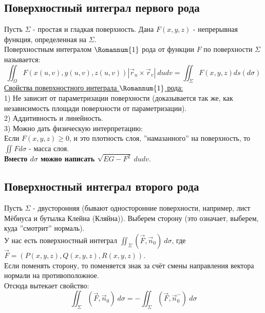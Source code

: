 \documentclass[12pt]{article}
\begin{document}
\subsection{Поверхностный интеграл первого рода}
Пусть $\Sigma$ - простая и гладкая поверхность. Дана $F(x,y,z)$ - непрерывная функция, определенная на $\Sigma$.\\
Поверхностным интегралом $\Romannum{1}$ рода от функции $F$ по поверхности $\Sigma$ называется:\\
$$\iint_\Omega F(x(u,v),y(u,v),z(u,v)) | \overrightarrow{r}_u \times \overrightarrow{r}_v| \ dudv = \iint_\Sigma F(x,y,z) ds (d\sigma)$$
\uline{Свойства поверхностного интеграла $\Romannum{1}$ рода:}\\
1) Не зависит от параметризации поверхности (доказывается так же, как независимость площади поверхности от параметризации).\\
2) Аддитивность и линейность.\\
3) Можно дать физическую интерпретацию:\\
Если $F(x,y,z) \geq 0$, и это плотность слоя, ''намазанного'' на поверхность, то $\iint F d\sigma$ - масса слоя.\\
\textbf{Вместо $d\sigma$ можно написать $\sqrt{EG-F^2} \ dudv$}.\\
\subsection{Поверхностный интеграл второго рода}
Пусть $\Sigma$ - двусторонняя (бывают односторонние поверхности, например, лист Мёбиуса и бутылка Клейна (Кляйна)). Выберем сторону (это означает, выберем, куда ''смотрит'' нормаль).\\
У нас есть поверхностный интеграл $\iint_\Sigma (\overrightarrow{F}, \overrightarrow{n}_0) \ d\sigma$, где $\overrightarrow{F} = (P(x,y,z),Q(x,y,z),R(x,y,z))$.\\
Если поменять сторону, то поменяется знак за счёт смены направления вектора нормали на противоположное.\\
Отсюда вытекает свойство:\\
$$\iint_\Sigma (\overrightarrow{F}, \overrightarrow{n}_0) \ d\sigma = -\iint_\Sigma (\overrightarrow{F}, \overrightarrow{n}_0^{-}) \ d\sigma$$
\end{document}
